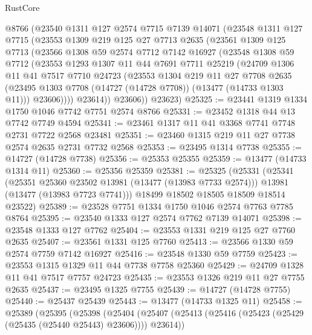 \begin{lexlean}{RustCore}
\begin{coremodule}
    @8766
    (@23540
      @1311
      @127
      @2574
      @7715
      @7139
      @14071
      (@23548
        @1311
        @127
        @7715
        (@23553
          @1309
          @219
          @125
          @27
          @7713
          @2635
          (@23561
            @1309
            @125
            @7713
            (@23566
              @1308
              @59
              @2574
              @7712
              @7142
              @16927
              (@23548
                @1308
                @59
                @7712
                (@23553
                  @1293
                  @1307
                  @11
                  @44
                  @7691
                  @7711
                  @25219
                  (@24709
                    @1306
                    @11
                    @41
                    @7517
                    @7710
                    @24723
                    (@23553
                      @1304
                      @219
                      @11
                      @27
                      @7708
                      @2635
                      (@23495 @1303 @7708 (@14727 (@14728 @7708)) (@13477 (@14733 @1303 @11)))
                      @23606))))
              @23614))
          @23606))
      @23623)
@25325 := @23441 @1319 @1334 @1750 @1046 @7742 @7751 @2574 @8766
@25331 := @23452 @1318 @44 @13 @7742 @7749 @4594
@25341 := @23461 @1317 @11 @41 @3368 @7741 @7748 @2731 @7722 @2568 @23481
@25351 := @23460 @1315 @219 @11 @27 @7738 @2574 @2635 @2731 @7732 @2568
@25353 := @23495 @1314 @7738
@25355 := @14727 (@14728 @7738)
@25356 := @25353 @25355
@25359 := @13477 (@14733 @1314 @11)
@25360 := @25356 @25359
@25381 := @25325
    (@25331
      (@25341
        (@25351 @25360 @23502 @13981 (@13477 (@13983 @7733 @2574)))
        @13981
        (@13477 (@13983 @7723 @7741)))
      @18499
      @18502
      @18505
      @18509
      @18514
      @23522)
@25389 := @23528 @7751 @1334 @1750 @1046 @2574 @7763 @7785 @8764
@25395 := @23540 @1333 @127 @2574 @7762 @7139 @14071
@25398 := @23548 @1333 @127 @7762
@25404 := @23553 @1331 @219 @125 @27 @7760 @2635
@25407 := @23561 @1331 @125 @7760
@25413 := @23566 @1330 @59 @2574 @7759 @7142 @16927
@25416 := @23548 @1330 @59 @7759
@25423 := @23553 @1315 @1329 @11 @44 @7738 @7758 @25360
@25429 := @24709 @1328 @11 @41 @7517 @7757 @24723
@25435 := @23553 @1326 @219 @11 @27 @7755 @2635
@25437 := @23495 @1325 @7755
@25439 := @14727 (@14728 @7755)
@25440 := @25437 @25439
@25443 := @13477 (@14733 @1325 @11)
@25458 := @25389
    (@25395
      (@25398
        (@25404
          (@25407 (@25413 (@25416 (@25423 (@25429 (@25435 (@25440 @25443) @23606)))) @23614))

\end{coremodule}
\end{lexlean}

